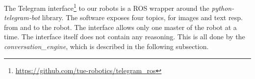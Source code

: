 \label{ssec:telegram}
The Telegram interface\footnote{\url{https://github.com/tue-robotics/telegram_ros}} to our robots is a ROS wrapper around the \emph{python-telegram-bot} library. The software exposes four topics, for images and text resp. from and to the robot. The interface allows only one master of the robot at a time. The interface itself does not contain any reasoning. This is all done by the \emph{conversation\_engine}, which is described in the following subsection.
